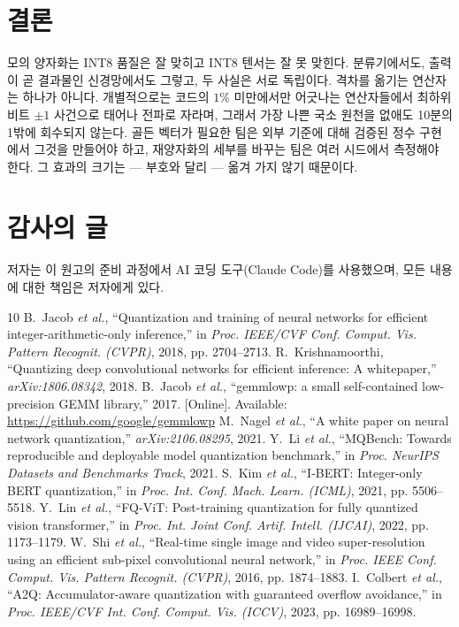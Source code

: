 \documentclass[journal]{IEEEtran}
\begin{document}
\section{결론}
모의 양자화는 INT8 품질은 잘 맞히고 INT8 텐서는 잘 못 맞힌다. 분류기에서도, 출력이 곧 결과물인 신경망에서도
그렇고, 두 사실은 서로 독립이다. 격차를 옮기는 연산자는
하나가 아니다. 개별적으로는 코드의 $1\%$ 미만에서만 어긋나는 연산자들에서 최하위 비트 $\pm 1$ 사건으로 태어나
전파로 자라며, 그래서 가장 나쁜 국소 원천을 없애도 10분의 1밖에 회수되지 않는다. 골든 벡터가 필요한 팀은 외부
기준에 대해 검증된 정수 구현에서 그것을 만들어야 하고, 재양자화의 세부를 바꾸는 팀은 여러 시드에서 측정해야 한다.
그 효과의 크기는 --- 부호와 달리 --- 옮겨 가지 않기 때문이다.

\section*{감사의 글}
저자는 이 원고의 준비 과정에서 AI 코딩 도구(Claude Code)를 사용했으며, 모든 내용에 대한 책임은 저자에게 있다.

\begin{thebibliography}{10}
 B.~Jacob \emph{et al.}, ``Quantization and training of neural networks for efficient integer-arithmetic-only
inference,'' in \emph{Proc. IEEE/CVF Conf. Comput. Vis. Pattern Recognit. (CVPR)}, 2018, pp. 2704--2713.
 R.~Krishnamoorthi, ``Quantizing deep convolutional networks for efficient inference: A whitepaper,''
\emph{arXiv:1806.08342}, 2018.
 B.~Jacob \emph{et al.}, ``gemmlowp: a small self-contained low-precision GEMM library,'' 2017. [Online].
Available: \url{https://github.com/google/gemmlowp}
 M.~Nagel \emph{et al.}, ``A white paper on neural network quantization,'' \emph{arXiv:2106.08295}, 2021.
 Y.~Li \emph{et al.}, ``MQBench: Towards reproducible and deployable model quantization benchmark,'' in
\emph{Proc. NeurIPS Datasets and Benchmarks Track}, 2021.
 S.~Kim \emph{et al.}, ``I-BERT: Integer-only BERT quantization,'' in \emph{Proc. Int. Conf. Mach. Learn. (ICML)},
2021, pp. 5506--5518.
 Y.~Lin \emph{et al.}, ``FQ-ViT: Post-training quantization for fully quantized vision transformer,'' in
\emph{Proc. Int. Joint Conf. Artif. Intell. (IJCAI)}, 2022, pp. 1173--1179.
 W.~Shi \emph{et al.}, ``Real-time single image and video super-resolution using an efficient
sub-pixel convolutional neural network,'' in \emph{Proc. IEEE Conf. Comput. Vis. Pattern Recognit. (CVPR)}, 2016,
pp. 1874--1883.
 I.~Colbert \emph{et al.}, ``A2Q: Accumulator-aware quantization with guaranteed overflow avoidance,'' in
\emph{Proc. IEEE/CVF Int. Conf. Comput. Vis. (ICCV)}, 2023, pp. 16989--16998.
\end{thebibliography}
\end{document}
